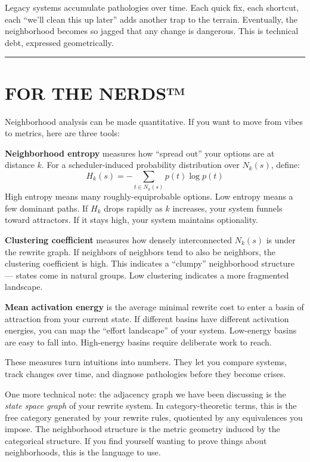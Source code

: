 Legacy systems accumulate pathologies over time. Each quick fix, each shortcut, each ``we'll clean this up later'' adds another trap to the terrain. Eventually, the neighborhood becomes so jagged that any change is dangerous. This is technical debt, expressed geometrically.

\begin{center}\rule{0.5\linewidth}{0.5pt}\end{center}

\section*{FOR THE NERDS™}

Neighborhood analysis can be made quantitative. If you want to move from vibes to metrics, here are three tools:

\textbf{Neighborhood entropy} measures how ``spread out'' your options are at distance $k$. For a scheduler-induced probability distribution over $N_k(s)$, define:
\[
H_k(s) = -\sum_{t \in N_k(s)} p(t) \log p(t)
\]
High entropy means many roughly-equiprobable options. Low entropy means a few dominant paths. If $H_k$ drops rapidly as $k$ increases, your system funnels toward attractors. If it stays high, your system maintains optionality.

\textbf{Clustering coefficient} measures how densely interconnected $N_k(s)$ is under the rewrite graph. If neighbors of neighbors tend to also be neighbors, the clustering coefficient is high. This indicates a ``clumpy'' neighborhood structure --- states come in natural groups. Low clustering indicates a more fragmented landscape.

\textbf{Mean activation energy} is the average minimal rewrite cost to enter a basin of attraction from your current state. If different basins have different activation energies, you can map the ``effort landscape'' of your system. Low-energy basins are easy to fall into. High-energy basins require deliberate work to reach.

These measures turn intuitions into numbers. They let you compare systems, track changes over time, and diagnose pathologies before they become crises.

One more technical note: the adjacency graph we have been discussing is the \emph{state space graph} of your rewrite system. In category-theoretic terms, this is the free category generated by your rewrite rules, quotiented by any equivalences you impose. The neighborhood structure is the metric geometry induced by the categorical structure. If you find yourself wanting to prove things about neighborhoods, this is the language to use.

